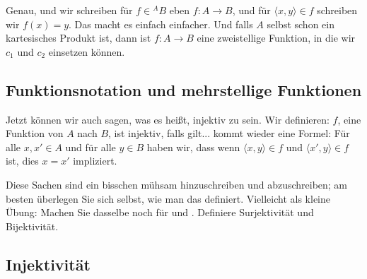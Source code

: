 \begin{spoken-clean}[01:02:54 - 01:04:01]
Genau, und wir schreiben für $f \in {}^A B$ eben $f \colon A \to B$, und für $\langle x, y \rangle \in f$ schreiben wir $f(x) = y$. Das macht es einfach einfacher. Und falls $A$ selbst schon ein kartesisches Produkt ist, dann ist $f \colon A \to B$ eine zweistellige Funktion, in die wir $c_1$ und $c_2$ einsetzen können.
\end{spoken-clean}

\subsection{Funktionsnotation und mehrstellige Funktionen}
\begin{math-stroke}

\end{math-stroke}

\begin{spoken-clean}[01:04:01 - 01:05:16]
Jetzt können wir auch sagen, was es heißt, injektiv zu sein. Wir definieren: $f$, eine Funktion von $A$ nach $B$, ist injektiv, falls gilt... kommt wieder eine Formel: Für alle $x, x' \in A$ und für alle $y \in B$ haben wir, dass wenn $\langle x, y \rangle \in f$ und $\langle x', y \rangle \in f$ ist, dies $x = x'$ impliziert.

Diese Sachen sind ein bisschen mühsam hinzuschreiben und abzuschreiben; am besten überlegen Sie sich selbst, wie man das definiert. Vielleicht als kleine Übung: Machen Sie dasselbe noch für  und . Definiere Surjektivität und Bijektivität.
\end{spoken-clean}

\subsection{Injektivität}
\begin{math-stroke}
\end{math-stroke}

